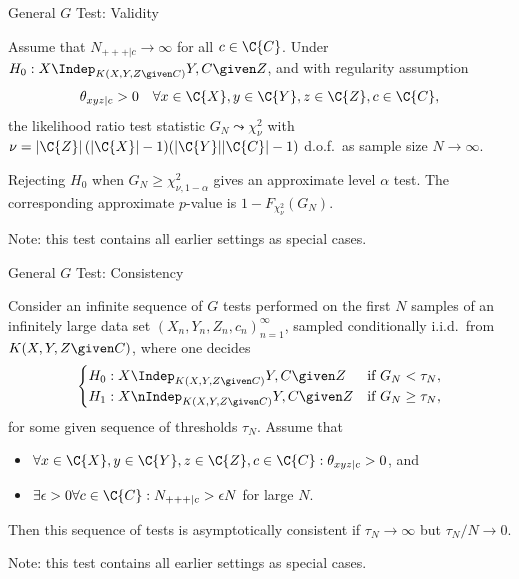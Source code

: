\begin{frame}{General $G$ Test: Validity}
\begin{Prp}[\ref{prp:general_G_test_asymptotics_H0}]
  Assume that $N_{+++|c} \to \infty$ for all $c \in \C{C}$.
  Under $H_0 : X \Indep_{K(X,Y,Z \given C)} Y,C \given Z$, and with regularity assumption
  $$\theta_{xyz|c} > 0 \quad\forall x \in \C{X}, y \in \C{Y}, z \in \C{Z}, c \in \C{C},$$
  the likelihood ratio test statistic $G_N \leadsto \chi^2_\nu$ 
  with $\nu = |\C{Z}|\,(|\C{X}| - 1)(|\C{Y}||\C{C}| - 1)$ d.o.f.\ as sample size $N \to \infty$.
\end{Prp}
\begin{Cor}
  Rejecting $H_0$ when $G_N \ge \chi_{\nu,1-\alpha}^2$ gives an approximate level $\alpha$ test.
  The corresponding approximate $p$-value is $1-F_{\chi^2_\nu}(G_N)$.
\end{Cor}
Note: this test contains all earlier settings as special cases.
\end{frame}

\begin{frame}{General $G$ Test: Consistency}
\begin{Cor}[\ref{cor:gen_G_test_consistency}]
Consider an infinite sequence of $G$ tests performed on the first $N$ samples of an infinitely large
data set $(X_n,Y_n,Z_n,c_n)_{n=1}^\infty$, sampled conditionally i.i.d.\ from $K(X,Y,Z \given C)$,
where one decides
  $$\begin{cases}
    H_0 : X \Indep_{K(X,Y,Z \given C)} Y,C \given Z  & \text{if $G_N < \tau_N$},\\
    H_1 : X \nIndep_{K(X,Y,Z \given C)} Y,C \given Z & \text{if $G_N \ge \tau_N$,}
  \end{cases}$$
for some given sequence of thresholds $\tau_N$.
Assume that 
  \begin{itemize}
    \item $\forall x \in \C{X}, y \in \C{Y}, z \in \C{Z}, c \in \C{C} : \theta_{xyz|c} > 0$, and
    \item $\exists \epsilon > 0 \forall c \in \C{C} : N_{+++|c}  > \epsilon N$ for large $N$.
  \end{itemize}
Then this sequence of tests is asymptotically consistent if $\tau_N \to \infty$ but $\tau_N / N \to 0$.
\end{Cor}
Note: this test contains all earlier settings as special cases.
\end{frame}
